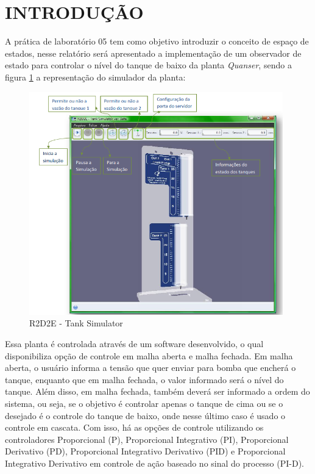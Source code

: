 \documentclass[a4paper,12pt]{article}
\begin{document}

\thispagestyle{main}

\section{INTRODUÇÃO}

\hspace{4ex}A prática de laboratório 05 tem como objetivo introduzir o conceito de espaço de estados, nesse relatório será apresentado a implementação de um observador de estado para controlar o nível do tanque de baixo da planta \textit{Quanser}, sendo a figura \ref{r2d2e} a representação do simulador da planta:

\begin{figure}[H]
\centering
\includegraphics[width=11cm]{ImagensLab4/simulator.png}
\caption{R2D2E - Tank Simulator}
\label{r2d2e}
\end{figure}

\hspace{4ex}Essa planta é controlada através de um software desenvolvido, o qual disponibiliza opção de controle em malha aberta e malha fechada. Em malha aberta, o usuário informa a tensão que quer enviar para bomba que encherá o tanque, enquanto que em malha fechada, o valor informado será o nível do tanque. Além disso, em malha fechada, também deverá ser informado a ordem do sistema, ou seja, se o objetivo é controlar apenas o tanque de cima ou se o desejado é o controle do tanque de baixo, onde nesse último caso é usado o controle em cascata. Com isso, há as opções de controle utilizando os controladores Proporcional (P), Proporcional Integrativo (PI), Proporcional Derivativo (PD), Proporcional Integrativo Derivativo (PID) e Proporcional Integrativo Derivativo em controle de ação baseado no sinal do processo (PI-D).
\end{document}
